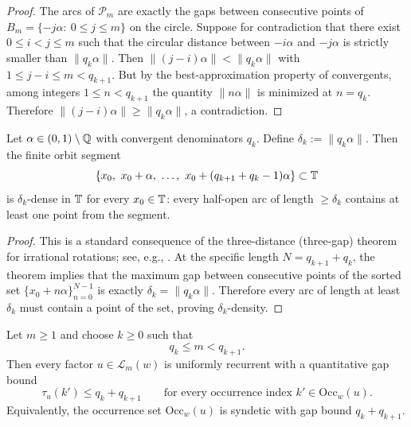 \begin{proof}
The arcs of $\mathcal{P}_m$ are exactly the gaps between consecutive points of $B_m=\{-j\alpha:\ 0\le j\le m\}$ on the circle.
Suppose for contradiction that there exist $0\le i<j\le m$ such that the circular distance between $-i\alpha$ and $-j\alpha$ is strictly smaller than $\|q_k\alpha\|$.
Then $\|(j-i)\alpha\|<\|q_k\alpha\|$ with $1\le j-i\le m<q_{k+1}$.
But by the best-approximation property of convergents, among integers $1\le n<q_{k+1}$ the quantity $\|n\alpha\|$ is minimized at $n=q_k$.
Therefore $\|(j-i)\alpha\|\ge \|q_k\alpha\|$, a contradiction.
\end{proof}

\begin{theorem}\label{thm:three_gap_density_corollary}
\MathTag Let $\alpha\in(0,1)\setminus\mathbb{Q}$ with convergent denominators $q_k$.
Define $\delta_k:=\|q_k\alpha\|$.
Then the finite orbit segment
\[
\{x_0,\ x_0+\alpha,\ \ldots,\ x_0+(q_{k+1}+q_k-1)\alpha\}\subset\TT
\]
is $\delta_k$-dense in $\mathbb{T}$ for every $x_0\in\mathbb{T}$:
every half-open arc of length $\ge \delta_k$ contains at least one point from the segment.
\end{theorem}

\begin{proof}
This is a standard consequence of the three-distance (three-gap) theorem for irrational rotations; see, e.g.,
\cite[Ch.\ 2, Theorem on three distances]{KuipersNiederreiter1974}.
At the specific length $N=q_{k+1}+q_k$, the theorem implies that the maximum gap between consecutive points of the sorted set $\{x_0+n\alpha\}_{n=0}^{N-1}$ is exactly $\delta_k=\|q_k\alpha\|$.
Therefore every arc of length at least $\delta_k$ must contain a point of the set, proving $\delta_k$-density.
\end{proof}

\begin{theorem}\label{thm:sturmian_return_time_qk_bound}
\MathTag Let $m\ge 1$ and choose $k\ge 0$ such that
\[
q_k\le m<q_{k+1}.
\]
Then every factor $u\in\mathcal{L}_m(w)$ is uniformly recurrent with a quantitative gap bound
\[
\tau_u(k')\le q_k+q_{k+1}\qquad\text{for every occurrence index }k'\in\mathrm{Occ}_w(u).
\]
Equivalently, the occurrence set $\mathrm{Occ}_w(u)$ is syndetic with gap bound $q_k+q_{k+1}$.
\end{theorem}

